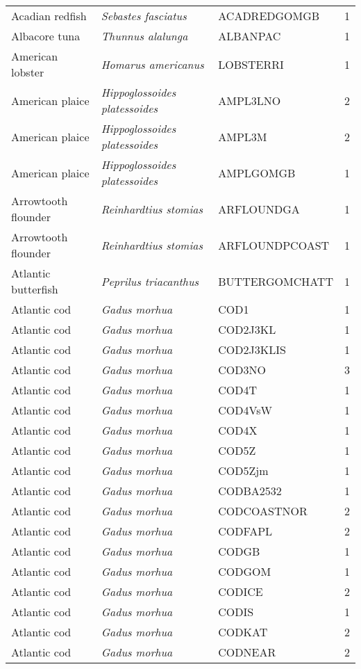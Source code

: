 \begin{center}
\begin{footnotesize}
\begin{longtable}{l | l | l | r}
Acadian redfish & \textit{Sebastes fasciatus} & ACADREDGOMGB & 1 \\
Albacore tuna & \textit{Thunnus alalunga} & ALBANPAC & 1 \\
American lobster & \textit{Homarus americanus} & LOBSTERRI & 1 \\
American plaice & \textit{Hippoglossoides platessoides} & AMPL3LNO & 2 \\
American plaice & \textit{Hippoglossoides platessoides} & AMPL3M & 2 \\
American plaice & \textit{Hippoglossoides platessoides} & AMPLGOMGB & 1 \\
Arrowtooth flounder & \textit{Reinhardtius stomias} & ARFLOUNDGA & 1 \\
Arrowtooth flounder & \textit{Reinhardtius stomias} & ARFLOUNDPCOAST & 1 \\
Atlantic butterfish & \textit{Peprilus triacanthus} & BUTTERGOMCHATT & 1 \\
Atlantic cod & \textit{Gadus morhua} & COD1 & 1 \\
Atlantic cod & \textit{Gadus morhua} & COD2J3KL & 1 \\
Atlantic cod & \textit{Gadus morhua} & COD2J3KLIS & 1 \\
Atlantic cod & \textit{Gadus morhua} & COD3NO & 3 \\
Atlantic cod & \textit{Gadus morhua} & COD4T & 1 \\
Atlantic cod & \textit{Gadus morhua} & COD4VsW & 1 \\
Atlantic cod & \textit{Gadus morhua} & COD4X & 1 \\
Atlantic cod & \textit{Gadus morhua} & COD5Z & 1 \\
Atlantic cod & \textit{Gadus morhua} & COD5Zjm & 1 \\
Atlantic cod & \textit{Gadus morhua} & CODBA2532 & 1 \\
Atlantic cod & \textit{Gadus morhua} & CODCOASTNOR & 2 \\
Atlantic cod & \textit{Gadus morhua} & CODFAPL & 2 \\
Atlantic cod & \textit{Gadus morhua} & CODGB & 1 \\
Atlantic cod & \textit{Gadus morhua} & CODGOM & 1 \\
Atlantic cod & \textit{Gadus morhua} & CODICE & 2 \\
Atlantic cod & \textit{Gadus morhua} & CODIS & 1 \\
Atlantic cod & \textit{Gadus morhua} & CODKAT & 2 \\
Atlantic cod & \textit{Gadus morhua} & CODNEAR & 2 \\

\end{longtable}
\end{footnotesize}
\end{center}
